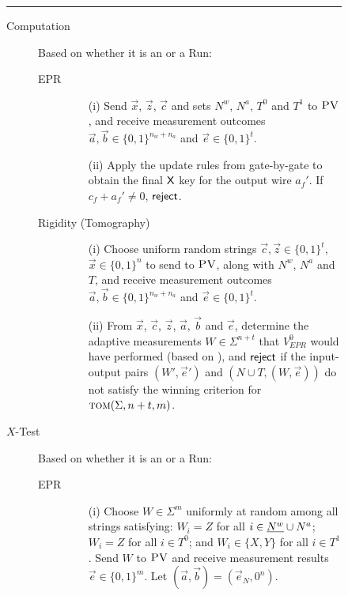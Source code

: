 \documentclass{toc}
\newcommand{\tom}{\textsc{tom}}
\newcommand{\pv}{\textsc{PV}}
\newcommand{\highlight}[1]{\uline{#1}}
\begin{document}
\begin{figure}[H]
\rule[1ex]{\textwidth}{0.5pt}
\vspace{-20pt}
\begin{description}
\item[Computation] Based on whether it is
an  or a  Run:
	\begin{description}
	\item[EPR]
		\begin{enumerate}
		\item[(i)] Send $\vec{x}$, $\vec{z}$, $\vec{c}$ and sets \highlight{$N^w$}, $N^a$, $T^0$
      and $T^1$ to $\pv$, and receive measurement outcomes \highlight{$\vec{a},\vec{b}\in
        \{0,1\}^{n_w + n_a}$} and $\vec{e}\in\{0,1\}^t$.
		\item[(ii)] Apply the update rules from  gate-by-gate to obtain the final $\sf X$ key for the output wire $a_f'$. If $c_f+a_f'\neq 0$, $\sf reject$. 
		\end{enumerate}
	\item[Rigidity (Tomography)]
		\begin{enumerate}
		\item[(i)] Choose uniform random strings $\vec{c},\vec{z}\in\{0,1\}^t$, $\vec{x} \in \{0,1\}^n$ 
      to send to $\pv$, along with \highlight{$N^w$}, $N^a$ and $T$, and receive measurement outcomes \highlight{$\vec{a}, \vec{b}\in \{0,1\}^{n_w + n_a}$} and $\vec{e}\in\{0,1\}^t$. 
		\item[(ii)]
		From $\vec{x}$, $\vec{c}$, $\vec{z}$, $\vec{a}$, $\vec{b}$ and $\vec{e}$, determine the adaptive measurements $W\in\Sigma^{n+t}$ that $V_{EPR}^0$ would have performed (based on ), and $\sf reject$ if the input-output pairs $(W',\vec{e}')$ and $(N\cup T,(W,\vec{e}))$ do not satisfy the winning criterion for $\tom(\Sigma,n+t,m)$.
		\end{enumerate}
	\end{description}
\item[$X$-Test] Based on whether it is
an  or a  Run:
\begin{description}
	\item[EPR] 
	\begin{enumerate}
		\item[(i)] Choose $W\in\Sigma^m$ uniformly at random among all strings
      satisfying: $W_i=Z$ for all $i\in \highlight{N^w} \cup N^a$; $W_i=Z$ for all $i\in T^0$; and $W_i\in\{X,Y\}$ for all $i\in T^1$. Send $W$ to $\pv$ and receive measurement results $\vec{e}\in\{0,1\}^m$. Let $(\vec{a},\vec{b})=(\vec{e}_N,0^n)$. 

\end{enumerate}
\end{description}
\end{description}
\end{figure}
\end{document}
